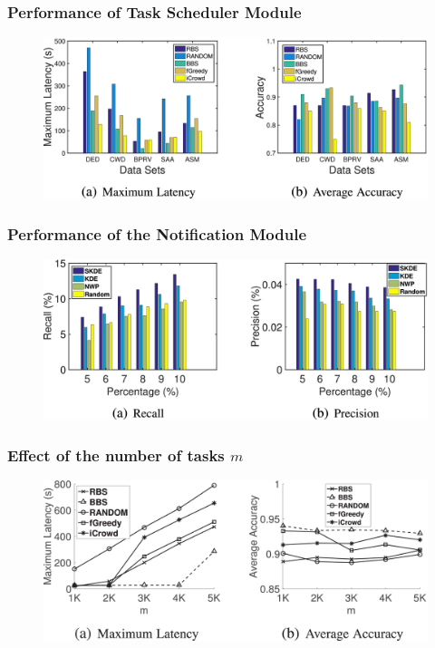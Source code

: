 \documentclass[UTF8]{beamer}
\begin{document}
\begin{frame}
    \frametitle{Performance of Task Scheduler Module}
    \begin{figure}
        \includegraphics[width= 0.95\linewidth]{chen2-2849394-hires.png}
     \end{figure}
\end{frame}

\begin{frame}
    \frametitle{Performance of the Notiﬁcation Module}
    \begin{figure}
        \includegraphics[width= 0.95\linewidth]{chen3-2849394-hires.png}
     \end{figure}
\end{frame}

\begin{frame}
    \frametitle{Effect of the number of tasks $m$}
    \begin{figure}
        \includegraphics[width= 0.95\linewidth]{chen4-2849394-hires.png}
     \end{figure}
\end{frame}
\end{document}
